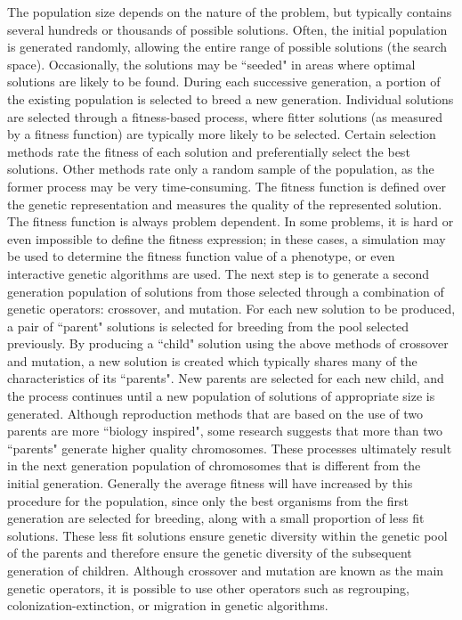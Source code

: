 The population size depends on the nature of the problem, but typically contains several hundreds or thousands of possible solutions. Often, the initial population is generated randomly, allowing the entire range of possible solutions (the search space). Occasionally, the solutions may be ``seeded" in areas where optimal solutions are likely to be found.
During each successive generation, a portion of the existing population is selected to breed a new generation. Individual solutions are selected through a fitness-based process, where fitter solutions (as measured by a fitness function) are typically more likely to be selected. Certain selection methods rate the fitness of each solution and preferentially select the best solutions. Other methods rate only a random sample of the population, as the former process may be very time-consuming.
The fitness function is defined over the genetic representation and measures the quality of the represented solution. The fitness function is always problem dependent.
In some problems, it is hard or even impossible to define the fitness expression; in these cases, a simulation may be used to determine the fitness function value of a phenotype, or even interactive genetic algorithms are used.
The next step is to generate a second generation population of solutions from those selected through a combination of genetic operators: crossover, and mutation.
For each new solution to be produced, a pair of ``parent" solutions is selected for breeding from the pool selected previously. By producing a ``child" solution using the above methods of crossover and mutation, a new solution is created which typically shares many of the characteristics of its ``parents". New parents are selected for each new child, and the process continues until a new population of solutions of appropriate size is generated. Although reproduction methods that are based on the use of two parents are more ``biology inspired", some research suggests that more than two ``parents" generate higher quality chromosomes.
These processes ultimately result in the next generation population of chromosomes that is different from the initial generation. Generally the average fitness will have increased by this procedure for the population, since only the best organisms from the first generation are selected for breeding, along with a small proportion of less fit solutions. These less fit solutions ensure genetic diversity within the genetic pool of the parents and therefore ensure the genetic diversity of the subsequent generation of children.
Although crossover and mutation are known as the main genetic operators, it is possible to use other operators such as regrouping, colonization-extinction, or migration in genetic algorithms.
